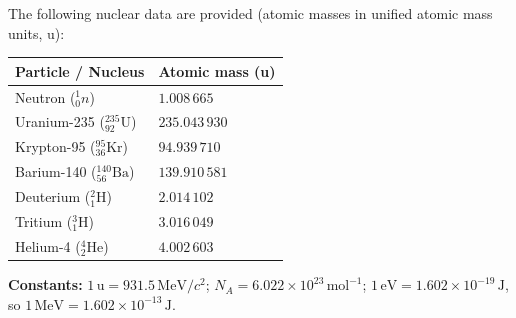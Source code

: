 \documentclass[11pt]{article}
\begin{document}
The following nuclear data are provided (atomic masses in unified atomic mass units, u):
\begin{center}
\begin{tabularx}{\linewidth}{|l|X|}\hline
\rowcolor{popblueL}
\textbf{Particle / Nucleus} & \textbf{Atomic mass (u)} \\ \hline
Neutron ($^{1}_{0}n$) & $1.008\,665$ \\
Uranium-235 ($^{235}_{92}\mathrm{U}$) & $235.043\,930$ \\
Krypton-95 ($^{95}_{36}\mathrm{Kr}$) & $94.939\,710$ \\
Barium-140 ($^{140}_{56}\mathrm{Ba}$) & $139.910\,581$ \\
Deuterium ($^{2}_{1}\mathrm{H}$) & $2.014\,102$ \\
Tritium ($^{3}_{1}\mathrm{H}$) & $3.016\,049$ \\
Helium-4 ($^{4}_{2}\mathrm{He}$) & $4.002\,603$ \\ \hline
\end{tabularx}
\end{center}
\textbf{Constants:} $1\,\mathrm{u} = 931.5\,\mathrm{MeV}/c^2$; $N_A = 6.022 \times 10^{23}\,\mathrm{mol^{-1}}$; $1\,\mathrm{eV} = 1.602 \times 10^{-19}\,\mathrm{J}$, so $1\,\mathrm{MeV} = 1.602 \times 10^{-13}\,\mathrm{J}$.
\end{document}
